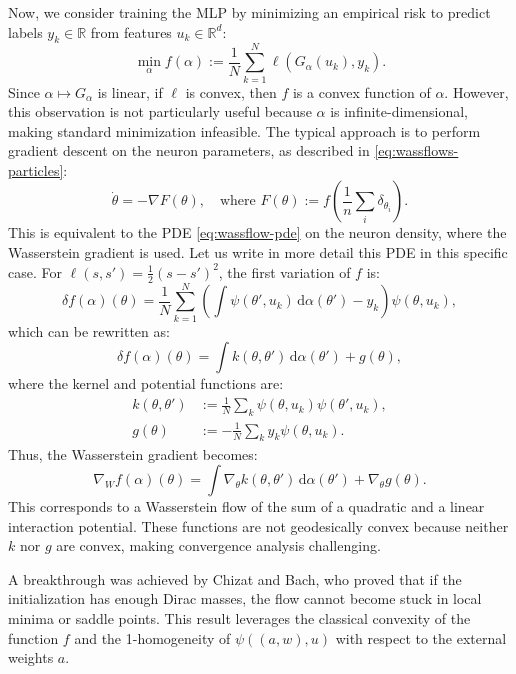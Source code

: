 Now, we consider training the MLP by minimizing an empirical risk to predict labels $y_k \in \mathbb{R}$ from features $u_k \in \mathbb{R}^d$:
\begin{equation}
    \min_\alpha f(\alpha) := \frac{1}{N} \sum_{k=1}^N \ell(G_\alpha(u_k), y_k).
\end{equation}
Since $\alpha \mapsto G_\alpha$ is linear, if $\ell$ is convex, then $f$ is a convex function of $\alpha$. However, this observation is not particularly useful because $\alpha$ is infinite-dimensional, making standard minimization infeasible. The typical approach is to perform gradient descent on the neuron parameters, as described in \eqref{eq:wassflows-particles}:
\begin{equation}
    \dot{\theta} = -\nabla F(\theta), \quad \text{where } F(\theta) := f\left(\frac{1}{n} \sum_i \delta_{\theta_i}\right).
\end{equation}
This is equivalent to the PDE \eqref{eq:wassflow-pde} on the neuron density, where the Wasserstein gradient is used.
%
Let us write in more detail this PDE in this specific case. 
For $\ell(s, s') = \frac{1}{2}(s - s')^2$, the first variation of $f$ is:
\begin{equation}
    \delta f(\alpha)(\theta) = \frac{1}{N} \sum_{k=1}^N \left(\int \psi(\theta', u_k) \, \mathrm{d} \alpha(\theta') - y_k\right) \psi(\theta, u_k),
\end{equation}
which can be rewritten as:
\begin{equation}
    \delta f(\alpha)(\theta) = \int k(\theta, \theta') \, \mathrm{d} \alpha(\theta') + g(\theta),
\end{equation}
where the kernel and potential functions are:
\begin{align}
    k(\theta, \theta') &:= \frac{1}{N} \sum_k \psi(\theta, u_k) \psi(\theta', u_k), \\
    g(\theta) &:= -\frac{1}{N} \sum_k y_k \psi(\theta, u_k).
\end{align}
Thus, the Wasserstein gradient becomes:
\begin{equation}
    \nabla_W f(\alpha)(\theta) = \int \nabla_\theta k(\theta, \theta') \, \mathrm{d} \alpha(\theta') + \nabla_\theta g(\theta).
\end{equation}
This corresponds to a Wasserstein flow of the sum of a quadratic and a linear interaction potential. These functions are not geodesically convex because neither $k$ nor $g$ are convex, making convergence analysis challenging.

A breakthrough was achieved by Chizat and Bach, who proved that if the initialization has enough Dirac masses, the flow cannot become stuck in local minima or saddle points. This result leverages the classical convexity of the function $f$ and the 1-homogeneity of $\psi((a, w), u)$ with respect to the external weights $a$.

